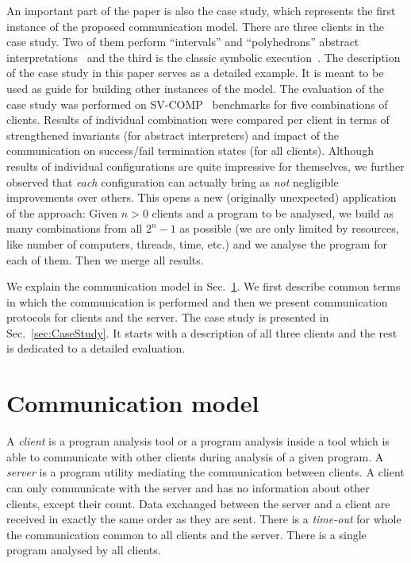 \documentclass[envcountsame]{llncs}
\begin{document}
An important part of the paper is also the case study, which represents the
first instance of the proposed communication model. There are three clients in
the case study. Two of them perform ``intervals'' and ``polyhedrons'' abstract
interpretations~\cite{AI_CousotCousot77} and the third is the classic symbolic
execution~\cite{SE_King76}. The description of the case study in this paper
serves as a detailed example. It is meant to be used as guide for building other
instances of the model. The evaluation of the case study was performed on
SV-COMP~\cite{SVCOMPURL} benchmarks for five combinations of clients. Results of
individual combination were compared per client in terms of strengthened
invariants (for abstract interpreters) and impact of the communication on
success/fail termination states (for all clients). Although results of
individual configurations are quite impressive for themselves, we further
observed that \emph{each} configuration can actually bring as \emph{not}
negligible improvements over others. This opens a new (originally unexpected)
application of the approach: Given $ n > 0 $ clients and a program to be
analysed, we build as many combinations from all $ 2^n - 1 $ as possible (we are
only limited by resources, like number of computers, threads, time, etc.) and we
analyse the program for each of them. Then we merge all results.

We explain the communication model in Sec.~\ref{sec:Communication}. We first
describe common terms in which the communication is performed and then we
present communication protocols for clients and the server. The case study is
presented in Sec.~\ref{sec:CaseStudy}. It starts with a description of all three
clients and the rest is dedicated to a detailed evaluation.

\section{Communication model}
\label{sec:Communication}

A \emph{client} is a program analysis tool or a program analysis inside a tool
which is able to  communicate with other clients during analysis of a given
program. A \emph{server} is a program utility mediating the communication
between clients. A client can only communicate with the server and has no
information about other clients, except their count. Data exchanged between the
server and a client are received in exactly the same order as they are sent.
There is a \emph{time-out} for whole the communication common to all clients and
the server. There is a single program analysed by all clients.
\end{document}
